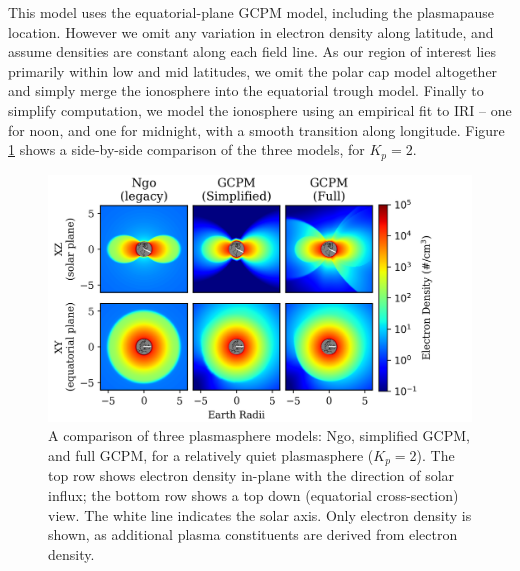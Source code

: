 This model uses the equatorial-plane GCPM model, including the plasmapause location. However we omit any variation in electron density along latitude, and assume densities are constant along each field line. As our region of interest lies primarily within low and mid latitudes, we omit the polar cap model altogether and simply merge the ionosphere into the equatorial trough model. Finally to simplify computation, we model the ionosphere using an empirical fit to IRI -- one for noon, and one for midnight, with a smooth transition along longitude. Figure \ref{fig:plasma_model_comparison} shows a side-by-side comparison of the three models, for $K_p=2$.
\begin{figure}[h]
\begin{center}
\includegraphics{figures/plasma_model_comparison_serif.png}
\caption[A Comparison of three plasmasphere electron density models]{A comparison of three plasmasphere models: Ngo, simplified GCPM, and full GCPM, for a relatively quiet plasmasphere ($K_p=2$). The top row shows electron density in-plane with the direction of solar influx; the bottom row shows a top down (equatorial cross-section) view. The white line indicates the solar axis. Only electron density is shown, as additional plasma constituents are derived from electron density.}
\label{fig:plasma_model_comparison}
\end{center}
\end{figure}


